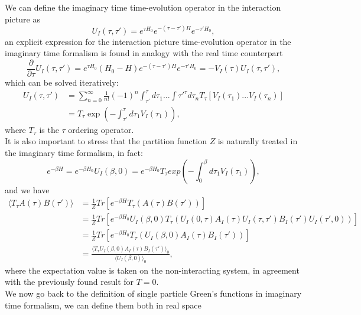 \documentclass[12pt, a4paper]{report}
\numberwithin{equation}{section}
\begin{document}
We can define the imaginary time time-evolution operator in the interaction picture as 
\begin{equation}
    U_I(\tau,\tau')=e^{\tau H_0}e^{-(\tau-\tau')H}e^{-\tau'H_0},
\end{equation}
an explicit expression for the interaction picture time-evolution operator in the imaginary time formalism is found in analogy with 
the real time counterpart
\begin{equation}
    \frac{\partial}{\partial\tau} U_I(\tau,\tau')=e^{\tau H_0}(H_0-H)e^{-(\tau-\tau')H}e^{-\tau'H_0}=-V_I(\tau)U_I(\tau,\tau'),
\end{equation}
which can be solved iteratively:
\begin{equation}
\begin{split}
    U_I(\tau,\tau')&=\sum_{n=0}^\infty\frac{1}{n!}(-1)^n\int_{\tau'}^{\tau}d\tau_1...\int{\tau'}^{\tau}d\tau_nT_\tau\left[V_I(\tau_1)...V_I(\tau_n)\right]\\
    &=T_\tau\exp{\left(-\int_{\tau'}^\tau d\tau_1V_I(\tau_1)\right)},
\end{split}
\end{equation}
where $T_\tau$ is the $\tau$ ordering operator.\\
It is also important to stress that the partition function $Z$ is naturally treated in the imaginary time formalism, in fact:
\begin{equation}
    e^{-\beta H}=e^{-\beta H_0}U_I(\beta,0)=e^{-\beta H_0}T_\tau exp{\left(-\int_{0}^{\beta}d\tau_1V_I(\tau_1)\right)},
\end{equation}
and we have
\begin{equation}
\begin{split}
    \langle T_\tau A(\tau)B(\tau')\rangle &= \frac{1}{Z}Tr\left[e^{-\beta H}T_\tau(A(\tau)B(\tau'))\right]\\
    &=\frac{1}{Z}Tr\left[e^{-\beta H_0}U_I(\beta,0)T_\tau(U_I(0,\tau)A_I(\tau)U_I(\tau,\tau')B_I(\tau')U_I(\tau',0)) \right]\\
    &=\frac{1}{Z}Tr\left[e^{-\beta H_0}T_\tau(U_I(\beta,0)A_I(\tau)B_I(\tau'))\right]\\
    &=\frac{\langle T_\tau U_I(\beta,0)A_I(\tau)B_I(\tau')\rangle_0}{\langle U_I(\beta,0)\rangle_0},
\end{split}
\end{equation}
where the expectation value is taken on the non-interacting system, in agreement with the previously found result for $T=0$.\\
We now go back to the definition of single particle Green's functions in imaginary time formalism, we can define them both in real space 
\end{document}
